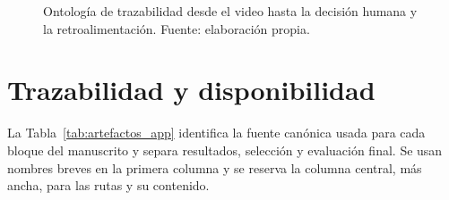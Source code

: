 \begin{figure}[H]
\centering
\resizebox{.98\textwidth}{!}{}
\caption{Ontología de trazabilidad desde el video hasta la decisión humana y la retroalimentación. Fuente: elaboración propia.}
\label{fig:ontologia_app}
\end{figure}

\clearpage
\begin{landscape}

\end{landscape}

\clearpage
\section{Trazabilidad y disponibilidad}
\label{app:disponibilidad}

La Tabla~\ref{tab:artefactos_app} identifica la fuente canónica usada para cada bloque del manuscrito y separa resultados, selección y evaluación final. Se usan nombres breves en la primera columna y se reserva la columna central, más ancha, para las rutas y su contenido.

